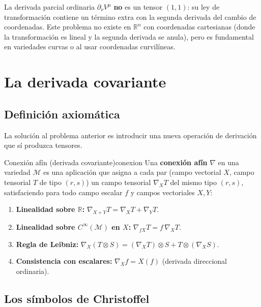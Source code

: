 \begin{importante}
La derivada parcial ordinaria $\partial_\nu V^\mu$ \textbf{no} es un tensor $(1,1)$: su ley de transformación contiene un término extra con la segunda derivada del cambio de coordenadas. Este problema no existe en $\mathbb{R}^n$ con coordenadas cartesianas (donde la transformación es lineal y la segunda derivada se anula), pero es fundamental en variedades curvas o al usar coordenadas curvilíneas.
\end{importante}

\section{La derivada covariante}
\label{sec:covd}

\subsection{Definición axiomática}

La solución al problema anterior es introducir una nueva operación de derivación que sí produzca tensores.

\begin{definicion}{Conexión afín (derivada covariante)}{conexion}
Una \textbf{conexión afín} $\nabla$ en una variedad $\mathcal{M}$ es una aplicación que asigna a cada par (campo vectorial $X$, campo tensorial $T$ de tipo $(r,s)$) un campo tensorial $\nabla_X T$ del mismo tipo $(r,s)$, satisfaciendo para todo campo escalar $f$ y campos vectoriales $X, Y$:
\begin{enumerate}[leftmargin=2em, label=\textbf{\arabic*.}]
  \item \textbf{Linealidad sobre $\mathbb{R}$:} $\nabla_{X+Y}T = \nabla_X T + \nabla_Y T$.
  \item \textbf{Linealidad sobre $C^\infty(\mathcal{M})$ en $X$:} $\nabla_{fX}T = f\,\nabla_X T$.
  \item \textbf{Regla de Leibniz:} $\nabla_X(T \otimes S) = (\nabla_X T) \otimes S + T \otimes (\nabla_X S)$.
  \item \textbf{Consistencia con escalares:} $\nabla_X f = X(f)$ (derivada direccional ordinaria).
\end{enumerate}
\end{definicion}

\subsection{Los símbolos de Christoffel}

